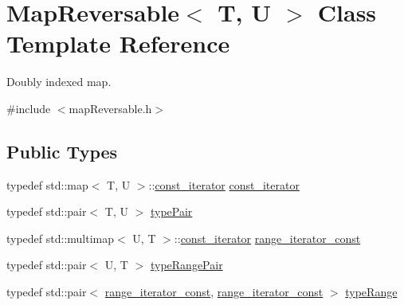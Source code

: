 \hypertarget{classMapReversable}{}\section{Map\+Reversable$<$ T, U $>$ Class Template Reference}
\label{classMapReversable}


Doubly indexed map.  




{\ttfamily \#include $<$map\+Reversable.\+h$>$}

\subsection*{Public Types}
\begin{DoxyCompactItemize}
\item 
typedef std\+::map$<$ T, U $>$\+::\hyperlink{classMapReversable_a7a41e7d60ba284a59e7bf76c8c53e9c2}{const\+\_\+iterator} \hyperlink{classMapReversable_a7a41e7d60ba284a59e7bf76c8c53e9c2}{const\+\_\+iterator}
\item 
typedef std\+::pair$<$ T, U $>$ \hyperlink{classMapReversable_a44d0737d4172eafced8eccc56ae06b8f}{type\+Pair}
\item 
typedef std\+::multimap$<$ U, T $>$\+::\hyperlink{classMapReversable_a7a41e7d60ba284a59e7bf76c8c53e9c2}{const\+\_\+iterator} \hyperlink{classMapReversable_aed8c3cc9e7a8601664db79d56d117adf}{range\+\_\+iterator\+\_\+const}
\item 
typedef std\+::pair$<$ U, T $>$ \hyperlink{classMapReversable_a1e0d482abfd4a66490f667a8fe64be88}{type\+Range\+Pair}
\item 
typedef std\+::pair$<$ \hyperlink{classMapReversable_aed8c3cc9e7a8601664db79d56d117adf}{range\+\_\+iterator\+\_\+const}, \hyperlink{classMapReversable_aed8c3cc9e7a8601664db79d56d117adf}{range\+\_\+iterator\+\_\+const} $>$ \hyperlink{classMapReversable_a00452d0ddb300578955ed93560508ad0}{type\+Range}
\end{DoxyCompactItemize}
